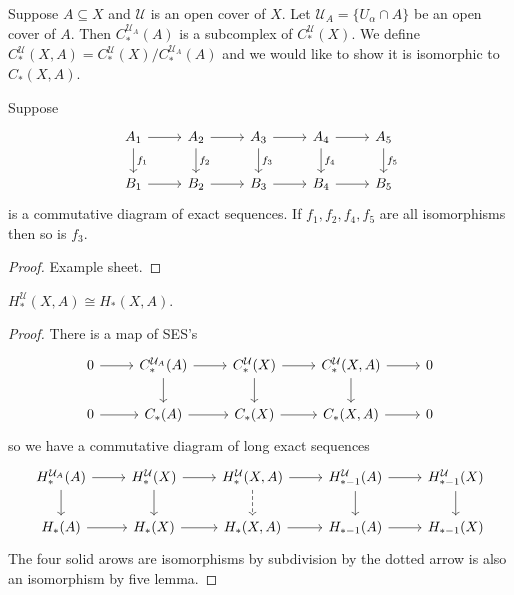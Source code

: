 \documentclass[a4paper]{article}
\begin{document}
Suppose \(A \subseteq X\) and \(\mathcal U\) is an open cover of \(X\). Let \(\mathcal U_A = \{U_\alpha \cap A\}\) be an open cover of \(A\). Then \(C_*^{\mathcal U_A}(A)\) is a subcomplex of \(C_*^{\mathcal U}(X)\). We define \(C_*^{\mathcal U}(X, A) = C_*^{\mathcal U}(X)/C_*^{\mathcal U_A}(A)\) and we would like to show it is isomorphic to \(C_*(X, A)\).

\begin{lemma}
  Suppose
  \[
    \begin{tikzcd}
      A_1 \ar[r] \ar[d, "f_1"] & A_2 \ar[r] \ar[d, "f_2"] & A_3 \ar[r] \ar[d, "f_3"] & A_4 \ar[r] \ar[d, "f_4"] & A_5 \ar[d, "f_5"] \\
      B_1 \ar[r] & B_2 \ar[r] & B_3 \ar[r] & B_4 \ar[r] & B_5
    \end{tikzcd}
  \]
  is a commutative diagram of exact sequences. If \(f_1, f_2, f_4, f_5\) are all isomorphisms then so is \(f_3\).
\end{lemma}

\begin{proof}
  Example sheet.
\end{proof}

\begin{corollary}
  \(H_*^{\mathcal U}(X, A) \cong H_*(X, A)\).
\end{corollary}

\begin{proof}
  There is a map of SES's
  \[
    \begin{tikzcd}
      0 \ar[r] & C_*^{\mathcal U_A}(A) \ar[r] \ar[d] & C_*^{\mathcal U}(X) \ar[r] \ar[d] & C_*^{\mathcal U}(X, A) \ar[r] \ar[d] & 0 \\
      0 \ar[r] & C_*(A) \ar[r] & C_*(X) \ar[r] & C_*(X, A) \ar[r] & 0
    \end{tikzcd}
  \]
  so we have a commutative diagram of long exact sequences
  \[
    \begin{tikzcd}
      H_*^{\mathcal U_A}(A) \ar[r] \ar[d] & H_*^{\mathcal U}(X) \ar[r] \ar[d] & H_*^{\mathcal U}(X, A) \ar[r] \ar[d, dashed] & H_{* - 1}^{\mathcal U}(A) \ar[r] \ar[d] & H_{* - 1}^{\mathcal U}(X) \ar[d] \\
      H_*(A) \ar[r] & H_*(X) \ar[r] & H_*(X, A) \ar[r] & H_{* - 1}(A) \ar[r] & H_{* - 1}(X)
    \end{tikzcd}
  \]
  The four solid arows are isomorphisms by subdivision by the dotted arrow is also an isomorphism by five lemma.
\end{proof}
\end{document}
